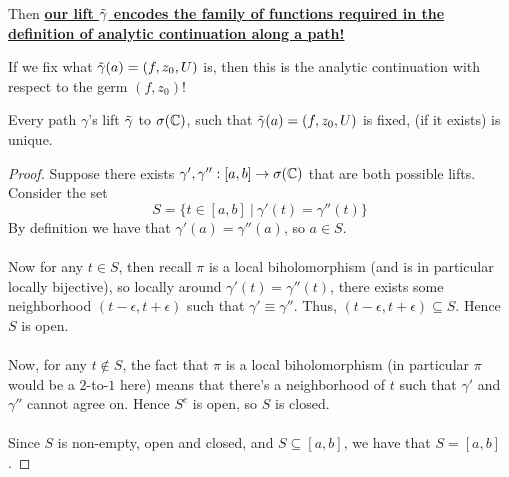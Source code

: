 Then \ul{\textbf{our lift $\Tilde{\gamma}$ encodes the family of functions required in the definition of analytic continuation along a path!}}

If we fix what $\Tilde{\gamma}(a) = (f, z_0, U)$ is, then this is the analytic continuation with respect to the germ $(f, z_0)$!

\begin{theorem}
    Every path $\gamma$'s lift $\Tilde{\gamma}$ to $\sigma(\mathbb{C})$, such that $\Tilde{\gamma}(a) = (f, z_0, U)$ is fixed, (if it exists) is unique.
\end{theorem}

\begin{proof}
    Suppose there exists $\gamma', \gamma'': [a, b] \to \sigma(\mathbb{C})$ that are both possible lifts. Consider the set
    \[S = \{t \in [a, b]\ |\ \gamma'(t) = \gamma''(t)\}\]
     By definition we have that $\gamma'(a) = \gamma''(a)$, so $a \in S$.\\\\
     Now for any $t \in S$, then recall $\pi$ is a local biholomorphism (and is in particular locally bijective), so locally around $\gamma'(t) = \gamma''(t)$, there exists some neighborhood $(t - \epsilon, t + \epsilon)$ such that $\gamma' \equiv \gamma''$. Thus, $(t - \epsilon, t + \epsilon) \subseteq S$. Hence $S$ is open.\\\\
     Now, for any $t \notin S$, the fact that $\pi$ is a local biholomorphism (in particular $\pi$ would be a $2$-to-$1$ here) means that there's a neighborhood of $t$ such that $\gamma'$ and $\gamma''$ cannot agree on. Hence $S^c$ is open, so $S$ is closed.\\\\
     Since $S$ is non-empty, open and closed, and $S \subseteq [a, b]$, we have that $S = [a, b]$.
\end{proof}